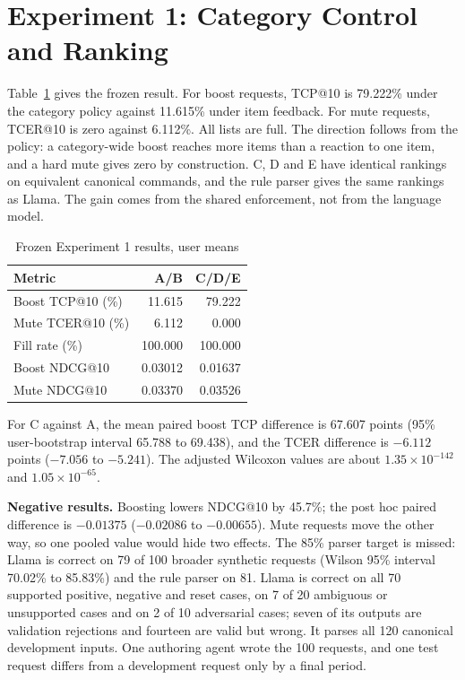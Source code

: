 \documentclass[conference]{IEEEtran}
\begin{document}
\section{Experiment 1: Category Control and Ranking}
Table~\ref{tab:e1} gives the frozen result. For boost requests, TCP@10 is 79.222\% under the category policy against 11.615\% under item feedback. For mute requests, TCER@10 is zero against 6.112\%. All lists are full. The direction follows from the policy: a category-wide boost reaches more items than a reaction to one item, and a hard mute gives zero by construction. C, D and E have identical rankings on equivalent canonical commands, and the rule parser gives the same rankings as Llama. The gain comes from the shared enforcement, not from the language model.

\begin{table}[t]\centering\footnotesize
\caption{Frozen Experiment 1 results, user means}\label{tab:e1}
\begin{tabular}{lrr}\toprule
Metric & A/B & C/D/E\\\midrule
Boost TCP@10 (\%) &11.615&79.222\\
Mute TCER@10 (\%) &6.112&0.000\\
Fill rate (\%) &100.000&100.000\\
Boost NDCG@10 &0.03012&0.01637\\
Mute NDCG@10 &0.03370&0.03526\\\bottomrule
\end{tabular}\end{table}

For C against A, the mean paired boost TCP difference is 67.607 points (95\% user-bootstrap interval 65.788 to 69.438), and the TCER difference is $-6.112$ points ($-7.056$ to $-5.241$). The adjusted Wilcoxon values are about $1.35\times10^{-142}$ and $1.05\times10^{-65}$.

\textbf{Negative results.} Boosting lowers NDCG@10 by 45.7\%; the post hoc paired difference is $-0.01375$ ($-0.02086$ to $-0.00655$). Mute requests move the other way, so one pooled value would hide two effects. The 85\% parser target is missed: Llama is correct on 79 of 100 broader synthetic requests (Wilson 95\% interval 70.02\% to 85.83\%) and the rule parser on 81. Llama is correct on all 70 supported positive, negative and reset cases, on 7 of 20 ambiguous or unsupported cases and on 2 of 10 adversarial cases; seven of its outputs are validation rejections and fourteen are valid but wrong. It parses all 120 canonical development inputs. One authoring agent wrote the 100 requests, and one test request differs from a development request only by a final period.
\end{document}
